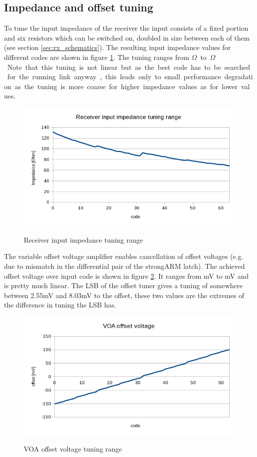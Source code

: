 \subsection{Impedance and offset tuning}

To tune the input impedance of the receiver the input consists of a fixed portion and six resistors which can be switched on, doubled in size between each of them (see section \ref{sec:rx_schematics}). The resulting input impedance values for different codes are shown in figure \ref{fig:rx_imp_tuning_range}. The tuning ranges from \unit[70]{$\Omega$} to \unit[130]{$\Omega$}. Note that this tuning is not linear but as the best code has to be searched for the running link anyway, this leads only to small performance degradation as the tuning is more coarse for higher impedance values as for lower values.

\begin{figure}[H]
  \centering
  {\includegraphics[scale=0.9]{plots/rx_inp_imp.png}}
  \caption{Receiver input impedance tuning range}
  \label{fig:rx_imp_tuning_range}
\end{figure}

The variable offset voltage amplifier enables cancellation of offset voltages (e.g. due to mismatch in the differential pair of the strongARM latch). The achieved offset voltage over input code is shown in figure \ref{fig:voa_offset}. It ranges from \unit[-100]{mV} to \unit[100]{mV} and is pretty much linear. The LSB of the offset tuner gives a tuning of somewhere between 2.55mV and 8.03mV to the offset, these two values are the extremes of the difference in tuning the LSB has.

\begin{figure}[H]
  \centering
  {\includegraphics[scale=0.9]{plots/voa_offset.png}}
  \caption{VOA offset voltage tuning range}
  \label{fig:voa_offset}
\end{figure}
